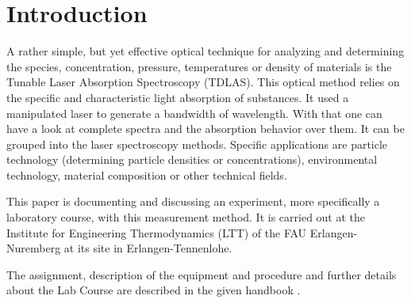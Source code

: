 
\chapter{Introduction}
\label{chap:intro}

A rather simple, but yet effective optical technique for analyzing and determining the species, concentration, pressure, temperatures or density of materials is the Tunable Laser Absorption Spectroscopy (TDLAS). This optical method relies on the specific and characteristic light absorption of substances. It used a manipulated laser to generate a bandwidth of wavelength. With that one can have a look at complete spectra and the absorption behavior over them. It can be grouped into the laser spectroscopy methods. Specific applications are particle technology (determining particle densities or concentrations), environmental technology, material composition or other technical fields.

This paper is documenting and discussing an experiment, more specifically a laboratory course, with this measurement method. It is carried out at the Institute for Engineering Thermodynamics (LTT) of the FAU Erlangen-Nuremberg at its site in Erlangen-Tennenlohe.

The assignment, description of the equipment and procedure and further details about the Lab Course are described in the given handbook \autocite{klevanskyTDLASTunableLaser2021}.


